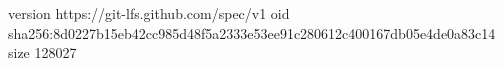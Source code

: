 version https://git-lfs.github.com/spec/v1
oid sha256:8d0227b15eb42cc985d48f5a2333e53ee91c280612c400167db05e4de0a83c14
size 128027
